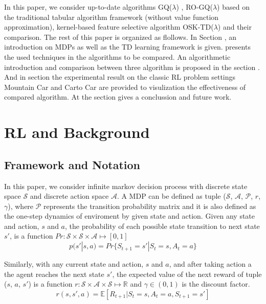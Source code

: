 \documentclass[conference]{IEEEtran}
\begin{document}
In this paper, we consider up-to-date algorithms GQ($\lambda$) \cite{maei2010gq}, RO-GQ($\lambda$) \cite{liu2012regularized} based on the traditional tabular algorithm framework (without value function approximation), kernel-based feature selective algorithm OSK-TD($\lambda$) \cite{chen2013online} and their comparison. The rest of this paper is organized as flollows. In Section \uppercase\expandafter{}, an introduction on MDPs as well as the TD learning framework is given. \uppercase\expandafter{} presents the used techniques in the algorithms to be compared. An algorithmetic introduction and comparison between three algorithm is proposed in the section \uppercase\expandafter{}. And in section \uppercase\expandafter{} the experimental result on the classic RL problem settings Mountain Car and Carto Car are provided to visulization the effectiveness of compared algorithm. At the \uppercase\expandafter{} section gives a conclussion and future work.\\

\section{RL and Background}
\subsection{Framework and Notation}
In this paper, we consider infinite markov decision process with discrete state space $\mathcal{S}$ and discrete action space $\mathcal{A}$. A  MDP can be defined as tuple ($\mathcal{S}$, $\mathcal{A}$, $\mathcal{P}$, $r$, $\gamma$), where $\mathcal{P}$ represents the transition probability matrix and it is also defined as the one-step dynamics of enviroment by given state and action. \cite{sutton1998reinforcement} Given any state and action, $s$ and $a$, the probability of each possible state transition to next state $s'$, is a function $Pr:\mathcal{S}\times\mathcal{S}\times\mathcal{A}\mapsto[0, 1]$
\begin{equation}
  p(s'|s, a)=Pr\{S_{t+1}=s'|S_t=s,A_t=a\}
\end{equation}


Similarly, with any current state and action, $s$ and $a$, and after taking action a the agent reaches the next state $s'$, the expected value of the next reward of tuple ($s$, $a$, $s'$) is a function $r:\mathcal{S}\times\mathcal{A}\times\mathcal{S}\mapsto\mathbb{R}$ and $\gamma\in(0, 1)$ is the discount factor.
\begin{equation}
  r(s, s', a)=\mathbb{E}[R_{t+1}|S_t=s,A_t=a, S_{t+1}=s']
\end{equation}
\end{document}
